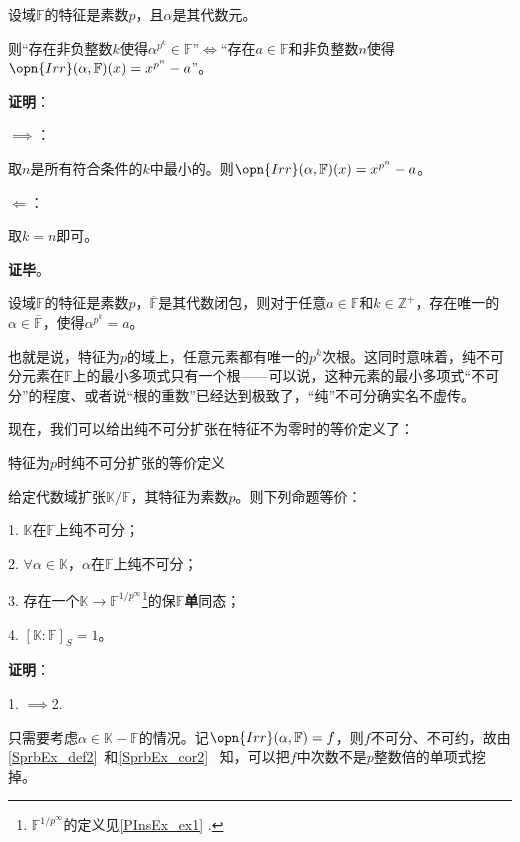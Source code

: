 \begin{lemma}{}
设域$\mathbb{F}$的特征是素数$p$，且$\alpha$是其代数元。

则“存在非负整数$k$使得$\alpha^{p^k}\in\mathbb{F}$”$\iff$“存在$a\in\mathbb{F}$和非负整数$n$使得$\opn{Irr}(\alpha, \mathbb{F})(x) = x^{p^n}-a$”。

\end{lemma}

\textbf{证明}：

$\implies$：

取$n$是所有符合条件的$k$中最小的。则$\opn{Irr}(\alpha, \mathbb{F})(x) = x^{p^n}-a$。

$\Leftarrow$：

取$k=n$即可。

\textbf{证毕}。

\begin{corollary}{}\label{PInsEx_cor1}
设域$\mathbb{F}$的特征是素数$p$，$\overline{\mathbb{F}}$是其代数闭包，则对于任意$a\in\mathbb{F}$和$k\in\mathbb{Z}^+$，存在唯一的$\alpha\in\overline{\mathbb{F}}$，使得$\alpha^{p^k}=a$。
\end{corollary}

也就是说，特征为$p$的域上，任意元素都有唯一的$p^k$次根。这同时意味着，纯不可分元素在$\mathbb{F}$上的最小多项式只有一个根——可以说，这种元素的最小多项式“不可分”的程度、或者说“根的重数”已经达到极致了，“纯”不可分确实名不虚传。


现在，我们可以给出纯不可分扩张在特征不为零时的等价定义了：




\begin{theorem}{特征为$p$时纯不可分扩张的等价定义}\label{PInsEx_the1}


给定代数域扩张$\mathbb{K}/\mathbb{F}$，其特征为素数$p$。则下列命题等价：

1. $\mathbb{K}$在$\mathbb{F}$上纯不可分；

2. $\forall \alpha\in\mathbb{K}$，$\alpha$在$\mathbb{F}$上纯不可分；

3. 存在一个$\mathbb{K}\to\mathbb{F}^{1/p^\infty}$\footnote{$\mathbb{F}^{1/p^\infty}$的定义见\autoref{PInsEx_ex1} .}的保$\mathbb{F}$\textbf{单}同态；

4. $[\mathbb{K}:\mathbb{F}]_S=1$。


\end{theorem}

\textbf{证明}：

1. $\implies$2. 

只需要考虑$\alpha\in\mathbb{K}-\mathbb{F}$的情况。记$\opn{Irr}(\alpha, \mathbb{F})=f$，则$f$不可分、不可约，故由\autoref{SprbEx_def2}~和\autoref{SprbEx_cor2}~ 知，可以把$f$中次数不是$p$整数倍的单项式挖掉。

